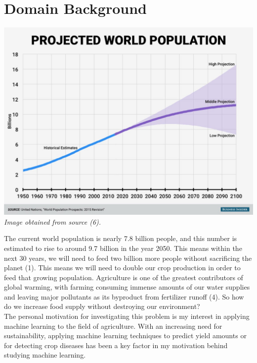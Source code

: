 \documentclass[12pt, a4paper]{article}
\begin{document}
\begin{spacing}{1.1}
	\begin{titlepage}
		\vspace*{4cm}
		\renewcommand*\contentsname{Table of Contents}
		\tableofcontents
	\end{titlepage} \newpage


	\section{Domain Background}
	\begin{center}
	\includegraphics[scale=.24]{pop} \\
	\textit{Image obtained from source (6).}
	\end{center}
	The current world population is nearly 7.8 billion people, and this number is estimated to rise to around 9.7 billion in the year 2050. This means within the next 30 years, we will need to feed two billion more people without sacrificing the planet (1). This means we will need to double our crop production in order to feed that growing population. Agriculture is one of the greatest contributors of global warming, with farming consuming immense amounts of our water supplies and leaving major pollutants as its byproduct from fertilizer runoff (4). So how do we increase food supply without destroying our environment? \vspace*{2mm}\\
	The personal motivation for investigating this problem is my interest in applying machine learning to the field of agriculture. With an increasing need for sustainability, applying machine learning techniques to predict yield amounts or for detecting crop diseases has been a key factor in my motivation behind studying machine learning.



\end{spacing}
\end{document}
